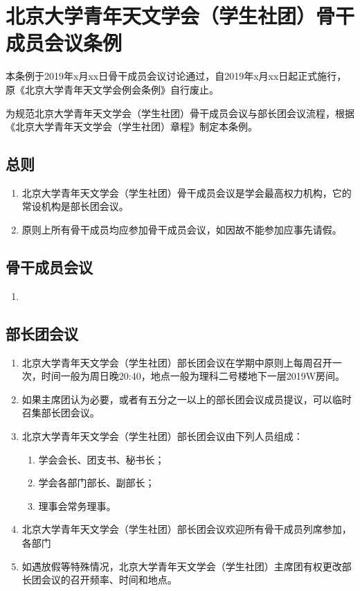 \chapter{北京大学青年天文学会（学生社团）骨干成员会议条例}

本条例于2019年x月xx日骨干成员会议讨论通过，自2019年x月xx日起正式施行，原《北京大学青年天文学会例会条例》自行废止。

为规范北京大学青年天文学会（学生社团）骨干成员会议与部长团会议流程，根据《北京大学青年天文学会（学生社团）章程》制定本条例。

\section{总则}

\begin{enumerate}
    \item 北京大学青年天文学会（学生社团）骨干成员会议是学会最高权力机构，它的常设机构是部长团会议。
    
    \item 原则上所有骨干成员均应参加骨干成员会议，如因故不能参加应事先请假。
\end{enumerate}

\section{骨干成员会议}

\begin{enumerate}[resume]
    \item 
\end{enumerate}

\section{部长团会议}

\begin{enumerate}[resume]
    \item 北京大学青年天文学会（学生社团）部长团会议在学期中原则上每周召开一次，时间一般为周日晚20:40，地点一般为理科二号楼地下一层2019W房间。
    
    \item 如果主席团认为必要，或者有五分之一以上的部长团会议成员提议，可以临时召集部长团会议。
    
    \item 北京大学青年天文学会（学生社团）部长团会议由下列人员组成：
    
    \begin{enumerate}
        \item 学会会长、团支书、秘书长；
        \item 学会各部门部长、副部长；
        \item 理事会常务理事。
    \end{enumerate}

    \item 北京大学青年天文学会（学生社团）部长团会议欢迎所有骨干成员列席参加，各部门
    
    \item 如遇放假等特殊情况，北京大学青年天文学会（学生社团）主席团有权更改部长团会议的召开频率、时间和地点。
\end{enumerate}

